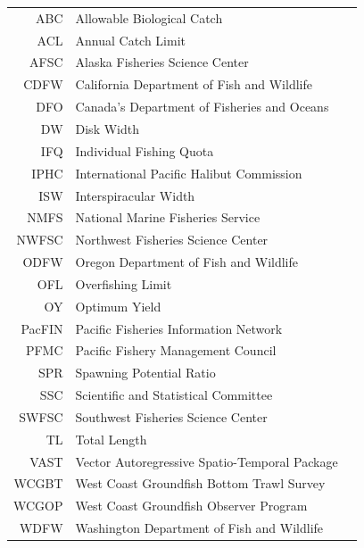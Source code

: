 \begin{center}
\begin{table}[ht]
\begin{tabular}{rll}
\hline
ABC & Allowable Biological Catch \\ 
  ACL & Annual Catch Limit \\ 
  AFSC & Alaska Fisheries Science Center \\ 
  CDFW & California Department of Fish and Wildlife \\ 
  DFO & Canada's Department of Fisheries and Oceans \\ 
  DW & Disk Width \\ 
  IFQ & Individual Fishing Quota \\ 
  IPHC & International Pacific Halibut Commission \\ 
  ISW & Interspiracular Width \\ 
  NMFS & National Marine Fisheries Service \\ 
  NWFSC & Northwest Fisheries Science Center \\ 
  ODFW & Oregon Department of Fish and Wildlife \\ 
  OFL & Overfishing Limit \\ 
  OY & Optimum Yield \\ 
  PacFIN & Pacific Fisheries Information Network \\ 
  PFMC & Pacific Fishery Management Council \\ 
  SPR & Spawning Potential Ratio \\ 
  SSC & Scientific and Statistical Committee \\ 
  SWFSC & Southwest Fisheries Science Center \\ 
  TL & Total Length \\ 
  VAST & Vector Autoregressive Spatio-Temporal Package \\ 
  WCGBT & West Coast Groundfish Bottom Trawl Survey \\ 
  WCGOP & West Coast Groundfish Observer Program \\ 
  WDFW & Washington Department of Fish and Wildlife \\ 
   \hline
\end{tabular}
\end{table}

\renewcommand{\arraystretch}{1}

\maketitle

\setcounter{page}{1}
\end{center}


